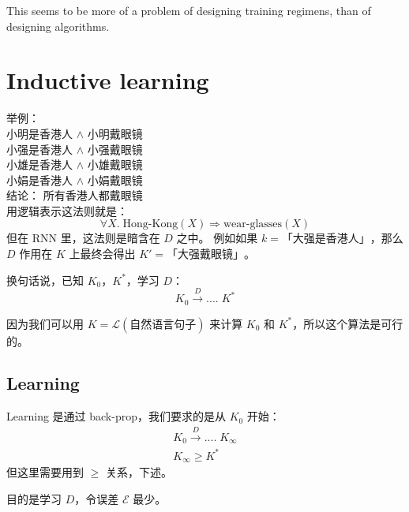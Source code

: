 \documentclass[12pt]{article}
\newcommand{\tab}{\hspace*{1cm}}
\begin{document}
This seems to be more of a problem of designing training regimens, than of designing algorithms.

\section{Inductive learning}

举例：\\
\tab 小明是香港人 $\wedge$ 小明戴眼镜 \\
\tab 小强是香港人 $\wedge$ 小强戴眼镜 \\
\tab 小雄是香港人 $\wedge$ 小雄戴眼镜 \\
\tab 小娟是香港人 $\wedge$ 小娟戴眼镜 \\
\tab 结论： 所有香港人都戴眼镜 \\
用逻辑表示这法则就是：
$$ \forall X. \; \mbox{Hong-Kong}(X) \Rightarrow \mbox{wear-glasses}(X) $$
但在 RNN 里，这法则是暗含在 $D$ 之中。 例如如果 $k = \mbox{「大强是香港人」}$，那么 $D$ 作用在 $K$ 上最终会得出 $K' = \mbox{「大强戴眼镜」}$。

换句话说，已知 $K_0$，$K^*$，学习 $D$：
$$ K_0 \stackrel{D}{\longrightarrow} .... \; K^* $$

因为我们可以用 $K = \mathcal{L}(\mbox{自然语言句子})$ 来计算 $K_0$ 和 $K^*$，所以这个算法是可行的。

\subsection{Learning}

Learning 是通过 back-prop，我们要求的是从 $K_0$ 开始：
\begin{eqnarray}
K_0 \stackrel{D}{\longrightarrow} .... \; K_\infty \nonumber \\
K_\infty \ge K^*
\end{eqnarray}
但这里需要用到 $\ge$ 关系，下述。

目的是学习 $D$，令误差 $\mathcal{E}$ 最少。
\end{document}
